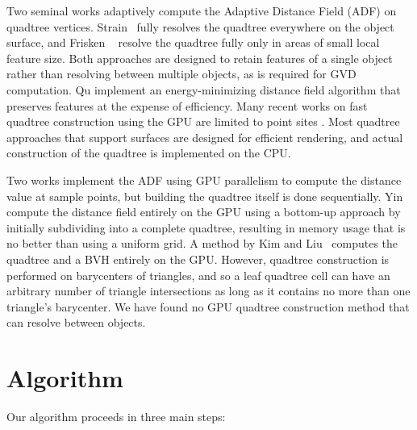 \documentclass[submission]{gmp2017}
\begin{document}
Two seminal works adaptively compute the Adaptive Distance Field (ADF) on quadtree vertices.  Strain~ fully resolves the quadtree everywhere on the object surface, and Frisken \etal~ resolve the quadtree fully only in areas of small local feature size.  Both approaches are designed to retain features of a single object rather than resolving between multiple objects, as is required for GVD computation.  Qu \etal {} implement an energy-minimizing distance field algorithm that preserves features at the expense of efficiency.  Many recent works on fast quadtree construction using the GPU are limited to point sites \cite{bedorf2012sparse,karras2012maximizing,zhou2011data}. Most quadtree approaches that support surfaces \cite{baert2013out,crassin2009gigavoxels,laine2011efficient,lefebvre2007compressed} are designed for efficient rendering, and actual construction of the quadtree is implemented on the CPU.

Two works \cite{bastos2008gpu,park2010cuda} implement the ADF using GPU parallelism to compute the distance value at sample points, but building the quadtree itself is done sequentially.  Yin \etal~ compute the distance field entirely on the GPU using a bottom-up approach by initially subdividing into a complete quadtree, resulting in memory usage that is no better than using a uniform grid.  A method by Kim and Liu~ computes the quadtree and a BVH entirely on the GPU. However, quadtree construction is performed on barycenters of triangles, and so a leaf quadtree cell can have an arbitrary number of triangle intersections as long as it contains no more than one triangle's barycenter.  We have found no GPU quadtree construction method that can resolve between objects.

\section{Algorithm}
\label{sec:algorithm}

Our algorithm proceeds in three main steps:
\end{document}
